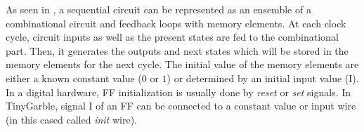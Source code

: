 As seen in , a sequential circuit can be represented as an ensemble of a combinational circuit and feedback loops with memory elements.
At each clock cycle, circuit inputs as well as the present states are fed to the combinational part.
Then, it generates the outputs and next states which will be stored in the memory elements for the next cycle.
The initial value of the memory elements are either a known constant value ($0$ or $1$) or determined by an initial input value (I).
In a digital hardware, FF initialization is usually done by \emph{reset} or \emph{set} signals.
In TinyGarble, signal I of an FF can be connected to a constant value or input wire (in this cased called \emph{init} wire).
